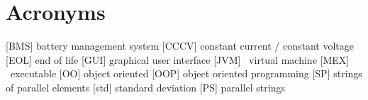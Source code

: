\section*{Acronyms}
\thispagestyle{plain}
\begin{acronym}
	[BMS] battery management system
	[CCCV] constant current / constant voltage
	[EOL] end of life
	[GUI] graphical user interface
	[JVM] \java\ virtual machine
	[MEX] \matlab\ executable
	[OO] object oriented
	[OOP] object oriented programming
	[SP] strings of parallel elements
	[std] standard deviation
	[PS] parallel strings
\end{acronym}